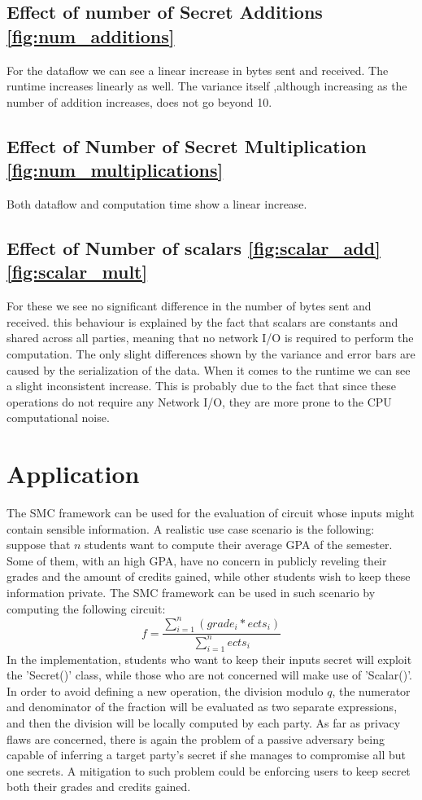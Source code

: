 \documentclass[10pt,conference,compsocconf]{IEEEtran}
\begin{document}
\subsection{Effect of number of Secret Additions \ref{fig:num_additions}}

For the dataflow we can see a linear increase in bytes sent and received.
The runtime increases linearly as well.
The variance itself ,although increasing as the number of addition increases, does not go beyond 10.

\subsection{Effect of Number of Secret Multiplication \ref{fig:num_multiplications}}
Both dataflow and computation time show a linear increase.

\subsection{Effect of Number of scalars \ref{fig:scalar_add}\ref{fig:scalar_mult}}
For these we see no significant difference in the number of bytes sent and received.
this behaviour is explained by the fact that scalars are constants and shared across all parties, meaning that no network
I/O is required to perform the computation.
The only slight differences shown by the variance and error bars are caused by the serialization of the data.
When it comes to the runtime we can see a slight inconsistent increase.
This is probably due to the fact that since these operations do not require any Network I/O, they are more
prone to the CPU computational noise.

\section{Application}
The SMC framework can be used for the evaluation of circuit whose inputs might contain sensible information. A realistic use case scenario is the following: suppose that $n$ students want to compute their average GPA of the semester. Some of them, with an high GPA, have no concern in publicly reveling their grades and the amount of credits gained, while other students wish to keep these information private. The SMC framework can be used in such scenario by computing the following circuit: 
\[f = \frac{\sum_{i=1}^{n}(grade_{i}*ects_{i})}{\sum_{i=1}^{n}ects_{i}}\]
In the implementation, students who want to keep their inputs secret will exploit the 'Secret()' class, while those who are not concerned will make use of 'Scalar()'.
In order to avoid defining a new operation, the division modulo $q$, the numerator and denominator of the fraction will be evaluated as two separate expressions, and then the division will be locally computed by each party.
As far as privacy flaws are concerned, there is again the problem of a passive adversary being capable of inferring a target party's secret if she manages to compromise all but one secrets. A mitigation to such problem could be enforcing users to keep secret both their grades and credits gained. 



\end{document}
